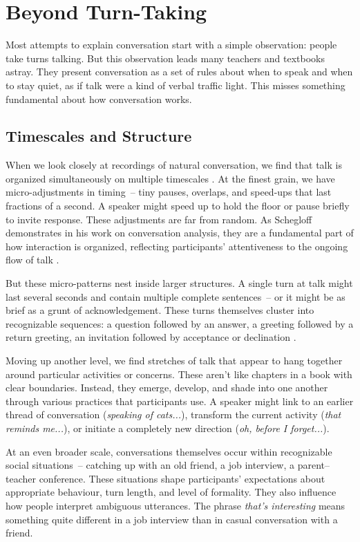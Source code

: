 \section{Beyond Turn-Taking} \label{sec:beyond-turns}

Most attempts to explain conversation start with a simple observation: people take turns talking. But this observation leads many teachers and textbooks astray. They present conversation as a set of rules about when to speak and when to stay quiet, as if talk were a kind of verbal traffic light. This misses something fundamental about how conversation works.

\subsection{Timescales and Structure} \label{subsec:timescales}

When we look closely at recordings of natural conversation, we find that talk is organized simultaneously on multiple timescales \citep{Schegloff1977,Fauviaux2023}. At the finest grain, we have micro-adjustments in timing~-- tiny pauses, overlaps, and speed-ups that last fractions of a second. A speaker might speed up to hold the floor or pause briefly to invite response. These adjustments are far from random. As Schegloff demonstrates in his work on conversation analysis, they are a fundamental part of how interaction is organized, reflecting participants' attentiveness to the ongoing flow of talk \citep{Schegloff1982}.

But these micro-patterns nest inside larger structures. A single turn at talk might last several seconds and contain multiple complete sentences~-- or it might be as brief as a grunt of acknowledgement. These turns themselves cluster into recognizable sequences: a question followed by an answer, a greeting followed by a return greeting, an invitation followed by acceptance or declination \citep{Sacks1973}.

Moving up another level, we find stretches of talk that appear to hang together around particular activities or concerns. These aren't like chapters in a book with clear boundaries. Instead, they emerge, develop, and shade into one another through various practices that participants use. A speaker might link to an earlier thread of conversation (\textit{speaking of cats...}), transform the current activity (\textit{that reminds me...}), or initiate a completely new direction (\textit{oh, before I forget...}).

At an even broader scale, conversations themselves occur within recognizable social situations~-- catching up with an old friend, a job interview, a parent--teacher conference. These situations shape participants' expectations about appropriate behaviour, turn length, and level of formality. They also influence how people interpret ambiguous utterances. The phrase \textit{that's interesting} means something quite different in a job interview than in casual conversation with a friend.


